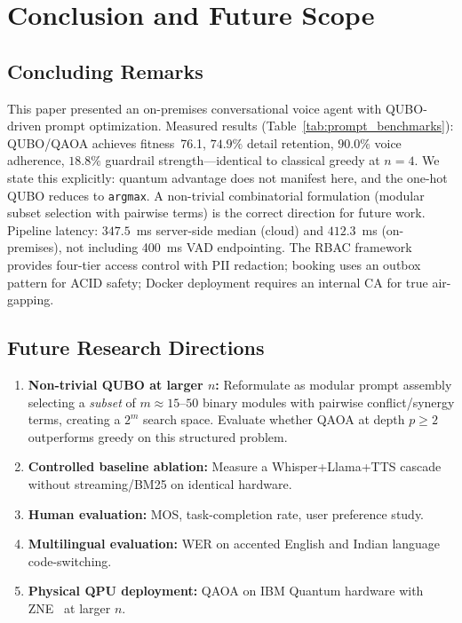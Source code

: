 \documentclass[11pt,a4paper]{article}
\begin{document}
\section{Conclusion and Future Scope}
\label{sec:conclusion}

\subsection{Concluding Remarks}

This paper presented an on-premises conversational voice agent with QUBO-driven prompt optimization. Measured results (Table~\ref{tab:prompt_benchmarks}): QUBO/QAOA achieves fitness~76.1, $74.9\%$ detail retention, $90.0\%$ voice adherence, $18.8\%$ guardrail strength---identical to classical greedy at $n{=}4$. We state this explicitly: quantum advantage does not manifest here, and the one-hot QUBO reduces to \texttt{argmax}. A non-trivial combinatorial formulation (modular subset selection with pairwise terms) is the correct direction for future work. Pipeline latency: $347.5$~ms server-side median (cloud) and $412.3$~ms (on-premises), not including 400~ms VAD endpointing. The RBAC framework provides four-tier access control with PII redaction; booking uses an outbox pattern for ACID safety; Docker deployment requires an internal CA for true air-gapping.

\subsection{Future Research Directions}

\begin{enumerate}[leftmargin=*]
    \item \textbf{Non-trivial QUBO at larger $n$:} Reformulate as modular prompt assembly selecting a \textit{subset} of $m{\approx}15$--$50$ binary modules with pairwise conflict/synergy terms, creating a $2^m$ search space. Evaluate whether QAOA at depth $p{\geq}2$ outperforms greedy on this structured problem.
    \item \textbf{Controlled baseline ablation:} Measure a Whisper+Llama+TTS cascade without streaming/BM25 on identical hardware.
    \item \textbf{Human evaluation:} MOS, task-completion rate, user preference study.
    \item \textbf{Multilingual evaluation:} WER on accented English and Indian language code-switching.
    \item \textbf{Physical QPU deployment:} QAOA on IBM Quantum hardware with ZNE~\cite{kandala2017hardware} at larger $n$.
\end{enumerate}
\end{document}
